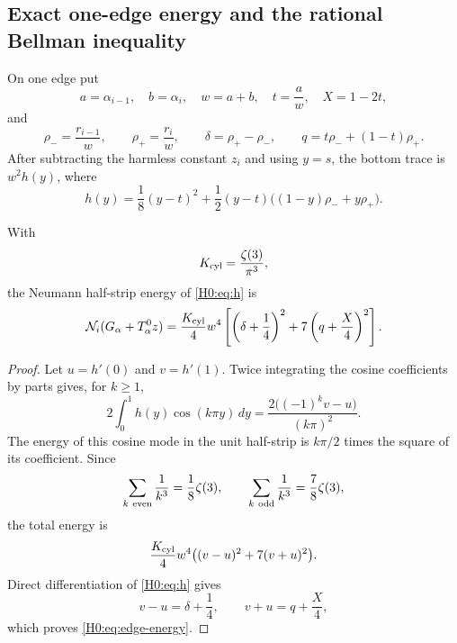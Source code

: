\subsection{Exact one-edge energy and the rational Bellman inequality}

On one edge put
\begin{equation}\label{H0:eq:normalized-variables}
 a=\alpha_{i-1},\quad b=\alpha_i,\quad w=a+b,
 \quad t=\frac aw,\quad X=1-2t,
\end{equation}
and
\begin{equation}
 \rho_-=\frac{r_{i-1}}w,\qquad
 \rho_+=\frac{r_i}w,\qquad
 \delta=\rho_+-\rho_-,\qquad
 q=t\rho_-+(1-t)\rho_+.
\end{equation}
After subtracting the harmless constant $z_i$ and using $y=s$, the bottom
trace is $w^2h(y)$, where
\begin{equation}\label{H0:eq:h}
 h(y)=\frac18(y-t)^2
 +\frac12(y-t)\bigl((1-y)\rho_-+y\rho_+\bigr).
\end{equation}

\begin{lemma}\label{H0:lem:edge-energy}
With
\begin{equation}
 K_{\rm cyl}=\frac{\zeta(3)}{\pi^3},
\end{equation}
the Neumann half-strip energy of \eqref{H0:eq:h} is
\begin{equation}\label{H0:eq:edge-energy}
 \mathcal N_i(G_\alpha+T_\alpha^0z)
 =\frac{K_{\rm cyl}}4w^4
 \left[\left(\delta+\frac14\right)^2
 +7\left(q+\frac X4\right)^2\right].
\end{equation}
\end{lemma}

\begin{proof}
Let $u=h'(0)$ and $v=h'(1)$.  Twice integrating the cosine coefficients by
parts gives, for $k\ge1$,
\begin{equation}
 2\int_0^1h(y)\cos(k\pi y)\,dy
 =\frac{2\bigl((-1)^kv-u\bigr)}{(k\pi)^2}.
\end{equation}
The energy of this cosine mode in the unit half-strip is $k\pi/2$ times
the square of its coefficient.  Since
\begin{equation}
 \sum_{k\ {\rm even}}\frac1{k^3}=\frac18\zeta(3),
\qquad
 \sum_{k\ {\rm odd}}\frac1{k^3}=\frac78\zeta(3),
\end{equation}
the total energy is
\begin{equation}
 \frac{K_{\rm cyl}}4w^4
 \bigl((v-u)^2+7(v+u)^2\bigr).
\end{equation}
Direct differentiation of \eqref{H0:eq:h} gives
\begin{equation}
 v-u=\delta+\frac14,
 \qquad v+u=q+\frac X4,
\end{equation}
which proves \eqref{H0:eq:edge-energy}.
\end{proof}


